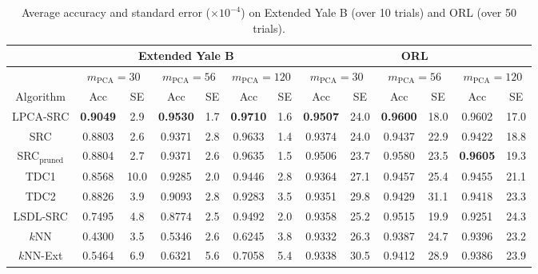 \documentclass[review]{elsarticle}
\begin{document}
\begin{table}[!htb] 
\small{
\centering
\begin{tabular}{|c|c|c|c|c|c|c|c|c|c|c|c|c|}
\hline
& \multicolumn{6}{|c|}{Extended Yale B} & \multicolumn{6}{|c|}{ORL} \\
\hline
& \multicolumn{2}{|c|}{$m_{\mathrm{PCA}} = 30$} & \multicolumn{2}{|c|}{$m_{\mathrm{PCA}} = 56$}  & \multicolumn{2}{|c|}{$m_{\mathrm{PCA}} = 120$}  & \multicolumn{2}{|c|}{$m_{\mathrm{PCA}} = 30$}  & \multicolumn{2}{|c|}{$m_{\mathrm{PCA}} = 56$} & \multicolumn{2}{|c|}{$m_{\mathrm{PCA}} = 120$}  \\
\hline
Algorithm & Acc & SE  & Acc & SE  &  Acc & SE  &  Acc & SE  &  Acc & SE &   Acc & SE   \\
\hline
LPCA-SRC & \textbf{0.9049}	&	2.9	&	\textbf{0.9530}	&	1.7	&	\textbf{0.9710}	&	1.6	&	\textbf{0.9507}	&	24.0	&	\textbf{0.9600}	&	18.0	&	0.9602	&	17.0 \\
SRC & 0.8803	&	2.6	&	0.9371	&	2.8	&	0.9633	&	1.4	&	0.9374	&	24.0	&	0.9437	&	22.9	&	0.9422	&	18.8 \\
SRC$_\text{pruned}$ & 0.8804	&	2.7	&	0.9371	&	2.6	&	0.9635	&	1.5	&	0.9506	&	23.7	&	0.9580	&	23.5	&	\textbf{0.9605}	&	19.3 \\
TDC1 &	0.8568	&	10.0	&	0.9285	&	2.0	&	0.9446	&	2.8 	&	0.9364	&	27.1	&	0.9457	&	25.4	&	0.9455	&	21.1	\\
TDC2 &	0.8826	&	3.9	&	0.9093	&	2.8	&	0.9283	&	3.5 	&	0.9351	&	29.8	&	0.9429	&	31.1	&	0.9418	&	23.3	\\
LSDL-SRC & 0.7495	&	4.8	&	0.8774	&	2.5	&	0.9492	&	2.0	&	0.9358	&	25.2	&	0.9515	&	19.9	&	0.9251	&	24.3	\\
$k$NN & 0.4300	& 3.5	& 0.5346	& 2.6	& 0.6245	& 3.8	& 0.9332	&	26.3	&	0.9387	&	24.7	&	0.9396	&	23.2 \\
$k$NN-Ext & 0.5464	& 6.9	& 0.6321	& 5.6	& 0.7058	& 5.4	& 0.9338	&	30.5	&	0.9412	&	28.9	&	0.9386	&	23.9\\
\hline
\end{tabular}
\caption{Average accuracy and standard error ($\times 10^{-4}$) on Extended Yale B (over 10 trials) and ORL (over 50 trials).} 
\label{Ext_Yale_B_ORL_res} }
\end{table}
\end{document}
